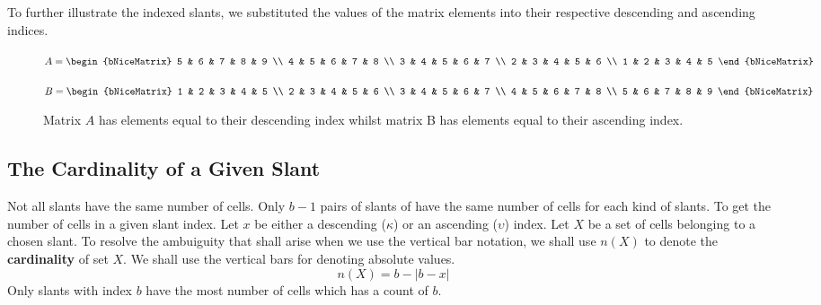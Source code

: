 \documentclass[letterpaper, twoside,12pt]{article}
\begin{document}
    To further illustrate the indexed slants, we substituted the values of the matrix elements into their respective descending and ascending indices.

    \begin{figure}[ht]
        \centering
        \begin{minipage}{0.45\textwidth}
            \centering
            {$
            A =
            \begin{bNiceMatrix}
                5 & 6 & 7 & 8 & 9 \\
                4 & 5 & 6 & 7 & 8 \\
                3 & 4 & 5 & 6 & 7 \\
                2 & 3 & 4 & 5 & 6 \\
                1 & 2 & 3 & 4 & 5
            \end{bNiceMatrix}
            $}
        \end{minipage}
        \hfill
        \begin{minipage}{0.45\textwidth}
            \centering
            {$
            B =
            \begin{bNiceMatrix}
                1 & 2 & 3 & 4 & 5 \\
                2 & 3 & 4 & 5 & 6 \\
                3 & 4 & 5 & 6 & 7 \\
                4 & 5 & 6 & 7 & 8 \\
                5 & 6 & 7 & 8 & 9
            \end{bNiceMatrix}
            $}
        \end{minipage}
        \caption{Matrix $A$ has elements equal to their descending index whilst matrix B has elements equal to their ascending index.}
    \end{figure}

    \subsection{The Cardinality of a Given Slant} \label{slant_cardinality}
    Not all slants have the same number of cells. Only $b-1$ pairs of slants of have the same number of cells for each kind of slants. To get the number of cells in a given slant index. Let $x$ be either a descending ($\kappa$) or an ascending ($\upsilon$) index. Let $X$ be a set of cells belonging to a chosen slant. To resolve the ambuiguity that shall arise when we use the vertical bar notation, we shall use $n(X)$ to denote the \textbf{cardinality} of set $X$. We shall use the vertical bars for denoting absolute values.
    \begin{equation}
        n(X) = b - |b - x|
    \end{equation}
    Only slants with index $b$ have the most number of cells which has a count of $b$.
\end{document}
